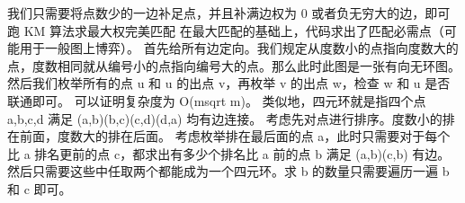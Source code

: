 {}我们只需要将点数少的一边补足点，并且补满边权为 \markdownRendererDollarSign{}0\markdownRendererDollarSign{} 或者负无穷大的边，即可跑 \markdownRendererDollarSign{}KM\markdownRendererDollarSign{} 算法求最大权完美匹配\markdownRendererInterblockSeparator
{}
\markdownRendererSectionEnd 
\markdownRendererSectionEnd \markdownRendererSectionBegin
{}\markdownRendererInterblockSeparator
{}在最大匹配的基础上，代码求出了匹配必需点（可能用于一般图上博弈）。\markdownRendererInterblockSeparator
{}\markdownRendererInterblockSeparator
{}
\markdownRendererSectionEnd 
\markdownRendererSectionEnd \markdownRendererSectionBegin
{}\markdownRendererInterblockSeparator
{}\markdownRendererSectionBegin
{}\markdownRendererInterblockSeparator
{}首先给所有边定向。我们规定从度数小的点指向度数大的点，度数相同就从编号小的点指向编号大的点。那么此时此图是一张有向无环图。\markdownRendererParagraphSeparator
{}然后我们枚举所有的点 \markdownRendererDollarSign{}u\markdownRendererDollarSign{} 和 \markdownRendererDollarSign{}u\markdownRendererDollarSign{} 的出点 \markdownRendererDollarSign{}v\markdownRendererDollarSign{}，再枚举 \markdownRendererDollarSign{}v\markdownRendererDollarSign{} 的出点 \markdownRendererDollarSign{}w\markdownRendererDollarSign{}，检查 \markdownRendererDollarSign{}w\markdownRendererDollarSign{} 和 \markdownRendererDollarSign{}u\markdownRendererDollarSign{} 是否联通即可。\markdownRendererParagraphSeparator
{}可以证明复杂度为 \markdownRendererDollarSign{}O(m\markdownRendererBackslash{}sqrt m)\markdownRendererDollarSign{}。\markdownRendererInterblockSeparator
{}\markdownRendererInterblockSeparator
{}
\markdownRendererSectionEnd \markdownRendererSectionBegin
{}\markdownRendererInterblockSeparator
{}类似地，四元环就是指四个点 \markdownRendererDollarSign{}a,b,c,d\markdownRendererDollarSign{} 满足 \markdownRendererDollarSign{}(a,b)(b,c)(c,d)(d,a)\markdownRendererDollarSign{} 均有边连接。\markdownRendererParagraphSeparator
{}考虑先对点进行排序。度数小的排在前面，度数大的排在后面。\markdownRendererParagraphSeparator
{}考虑枚举排在最后面的点 \markdownRendererDollarSign{}a\markdownRendererDollarSign{}，此时只需要对于每个比 \markdownRendererDollarSign{}a\markdownRendererDollarSign{} 排名更前的点 \markdownRendererDollarSign{}c\markdownRendererDollarSign{}，都求出有多少个排名比 \markdownRendererDollarSign{}a\markdownRendererDollarSign{} 前的点 \markdownRendererDollarSign{}b\markdownRendererDollarSign{} 满足 \markdownRendererDollarSign{}(a,b)(c,b)\markdownRendererDollarSign{} 有边。然后只需要这些中任取两个都能成为一个四元环。求 \markdownRendererDollarSign{}b\markdownRendererDollarSign{} 的数量只需要遍历一遍 \markdownRendererDollarSign{}b\markdownRendererDollarSign{} 和 \markdownRendererDollarSign{}c\markdownRendererDollarSign{} 即可。\markdownRendererParagraphSeparator
